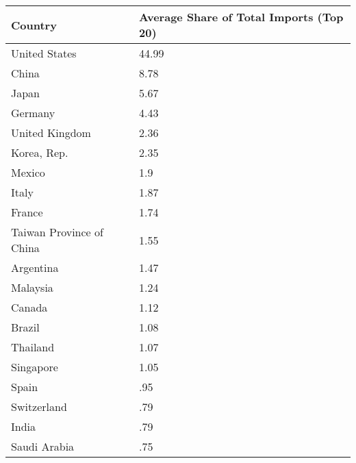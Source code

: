 \begin{table}[tbp] \centering
{}

\begin{tabularx}{\linewidth}{lC}

\toprule
{Country}&{Average Share of Total Imports (Top 20)} \tabularnewline
\midrule \addlinespace[\belowrulesep]
United States&44.99 \tabularnewline
China&8.78 \tabularnewline
Japan&5.67 \tabularnewline
Germany&4.43 \tabularnewline
United Kingdom&2.36 \tabularnewline
Korea, Rep.&2.35 \tabularnewline
Mexico&1.9 \tabularnewline
Italy&1.87 \tabularnewline
France&1.74 \tabularnewline
Taiwan Province of China&1.55 \tabularnewline
Argentina&1.47 \tabularnewline
Malaysia&1.24 \tabularnewline
Canada&1.12 \tabularnewline
Brazil&1.08 \tabularnewline
Thailand&1.07 \tabularnewline
Singapore&1.05 \tabularnewline
Spain&.95 \tabularnewline
Switzerland&.79 \tabularnewline
India&.79 \tabularnewline
Saudi Arabia&.75 \tabularnewline
\bottomrule 

\end{tabularx}
\end{table}
